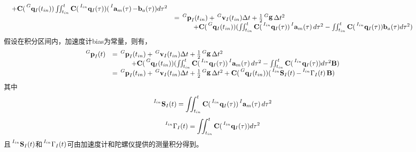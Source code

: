 \documentclass{article}
\begin{document}
\begin{equation}
\begin{array}{ll}
        +\textbf{C}(\sideset{^G}{}{\mathop{\mathbf{q}_{I}(t_{in})}})
        \iint_{t_{in}}^{t}\textbf{C}(\sideset{^{I_{in}}}{}{\mathop{\mathbf{q}_{I}(\tau)}})
        (\sideset{^I}{}{\mathop{\mathbf{a}_{m}(\tau)}}-\textbf{b}_{a}(\tau))d{\tau}^2\\
        &=\sideset{^G}{}{\mathop{\textbf{p}_{I}}}(t_{in})+
        \sideset{^G}{}{\mathop{\textbf{v}_{I}}}(t_{in})\Delta{t}
        +\frac{1}{2}\sideset{^G}{}{\mathop{\mathbf{g}}}\Delta{t}^{2}\\
        &\hspace{1cm}+\textbf{C}(\sideset{^G}{}{\mathop{\mathbf{q}_{I}(t_{in})}})
        (\iint_{t_{in}}^{t}\textbf{C}(\sideset{^{I_{in}}}{}{\mathop{\mathbf{q}_{I}(\tau)}})
        \sideset{^I}{}{\mathop{\mathbf{a}_{m}(\tau)}}d{\tau}^2
        -\iint_{t_{in}}^{t}\textbf{C}(\sideset{^{I_{in}}}{}{\mathop{\mathbf{q}_{I}(\tau)}})
        \textbf{b}_{a}(\tau)d{\tau}^2)
    \end{array}
\end{equation}
假设在积分区间内，加速度计bias为常量，则有，
\begin{equation}\label{eqs:imuInG}
    \begin{array}{ll}
        \sideset{^G}{}{\mathop{\textbf{p}_{I}}}(t)
        &=\sideset{^G}{}{\mathop{\textbf{p}_{I}}}(t_{in})+
        \sideset{^G}{}{\mathop{\textbf{v}_{I}}}(t_{in})\Delta{t}
        +\frac{1}{2}\sideset{^G}{}{\mathop{\mathbf{g}}}\Delta{t}^{2}\\
        &\hspace{1cm}+\textbf{C}(\sideset{^G}{}{\mathop{\mathbf{q}_{I}(t_{in})}})
        (\iint_{t_{in}}^{t}\textbf{C}(\sideset{^{I_{in}}}{}{\mathop{\mathbf{q}_{I}(\tau)}})
        \sideset{^I}{}{\mathop{\mathbf{a}_{m}(\tau)}}d{\tau}^2
        -\iint_{t_{in}}^{t}\textbf{C}(\sideset{^{I_{in}}}{}{\mathop{\mathbf{q}_{I}(\tau)}})
        d{\tau}^2\textbf{B})\\
        &=\sideset{^G}{}{\mathop{\textbf{p}_{I}}}(t_{in})+
        \sideset{^G}{}{\mathop{\textbf{v}_{I}}}(t_{in})\Delta{t}
        +\frac{1}{2}\sideset{^G}{}{\mathop{\mathbf{g}}}\Delta{t}^{2}
        +\textbf{C}(\sideset{^G}{}{\mathop{\mathbf{q}_{I}(t_{in})}})
        (\sideset{^{I_{in}}}{}{\mathop{\textbf{S}_{I}(t)}}
        -\sideset{^{I_{in}}}{}{\mathop{{\Gamma}_{I}(t)}}\textbf{B})
    \end{array}
\end{equation}
其中
\begin{equation}
    \sideset{^{I_{in}}}{}{\mathop{\textbf{S}_{I}(t)}}=\iint_{t_{in}}^{t}\textbf{C}(\sideset{^{I_{in}}}{}{\mathop{\mathbf{q}_{I}(\tau)}})
    \sideset{^I}{}{\mathop{\mathbf{a}_{m}(\tau)}}d{\tau}^2
\end{equation}
\begin{equation}\label{eqs:gammaDefine}
    \sideset{^{I_{in}}}{}{\mathop{{\Gamma}_{I}(t)}}=\iint_{t_{in}}^{t}\textbf{C}(\sideset{^{I_{in}}}{}{\mathop{\mathbf{q}_{I}(\tau)}})
    d{\tau}^2
\end{equation}
且$\sideset{^{I_{in}}}{}{\mathop{\textbf{S}_{I}(t)}}$和$\sideset{^{I_{in}}}{}{\mathop{{\Gamma}_{I}(t)}}$可由加速度计和陀螺仪提供的测量积分得到。
\end{document}
